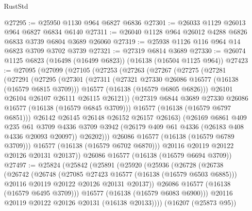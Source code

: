 \begin{lexlean}{RustStd}
\begin{coremodule}
@27295 := @25950 @1130 @964 @6827 @6836
@27301 := @26033 @1129 @26013 @964 @6827 @6834 @6140
@27311 := @26040 @1128 @964 @26012 @4288 @6826 @6833 @3739 @6804 @3689 @26060
@27319 := @25938 @1126 @116 @964 @14 @6823 @3709 @3702 @3739
@27321 := @27319 @6814 @3689
@27330 := @26074 @1125 @6823 (@16498 (@16499 @6823)) (@16138 (@16504 @1125 @964))
@27423 := @27095
    (@27099
      (@27105
        (@27253
          (@27263
            (@27267
              (@27275
                (@27281
                  (@27291
                    (@27295
                      (@27301
                        (@27311
                          (@27321 @27330 @26086 @16577 (@16138 (@16579 @6815 @3709)))
                          @16577
                          (@16138 (@16579 @6805 @6826)))
                        @26101
                        @26104
                        @26107
                        @26111
                        @26115
                        @26121))
                    (@27319 @6844 @3689 @27330 @26086 @16577 (@16138 (@16579 @6845 @3709)))
                    @16577
                    (@16138 (@16579 @6797 @6851)))
                  @26142
                  @26145
                  @26148
                  @26152
                  @26157
                  @26163)
                (@26169
                  @6861
                  @409
                  @235
                  @61
                  @3709
                  @4336
                  @3709
                  @3942
                  (@26179 @409 @61 @4336 (@26183 @408 @4336 @20093 @20097))
                  @26202)))
            @26086
            @16577
            (@16138 (@16579 @6789 @3709)))
          @16577
          (@16138 (@16579 @6702 @6870)))
        @20116
        @20119
        @20122
        @20126
        @20131
        @20137))
    @26086
    @16577
    (@16138 (@16579 @6694 @3709))
@27497 := @25824
    (@25842
      (@25891
        (@25920
          (@25936
            (@26728
              (@26738
                (@26742
                  (@26748
                    (@27085 @27423 @16577 (@16138 (@16579 @6503 @6885)))
                    @20116
                    @20119
                    @20122
                    @20126
                    @20131
                    @20137))
                @26086
                @16577
                (@16138 (@16579 @6495 @3709)))
              @16577
              (@16138 (@16579 @6083 @6900)))
            @20116
            @20119
            @20122
            @20126
            @20131
            (@16138 @20133))))
      (@16207 (@25873 @95))

\end{coremodule}
\end{lexlean}
